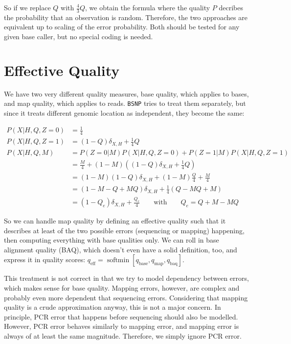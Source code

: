 \documentclass{article}
\begin{document}
So if we replace $Q$ with $\frac{4}{3}Q$, we obtain the formula where the quality $P$ decribes the probability that an observation
is random.  Therefore, the two approaches are equivalent up to scaling of the error probability.  Both should be tested for any
given base caller, but no special coding is needed.

\section{Effective Quality}
\label{app_qualities}

We have two very different quality measures, base quality, which applies to bases, and map quality, which applies to reads.
\texttt{BSNP} tries to treat them separately, but since it treats different genomic location as independent, they become the same:

\begin{align*}
P(X|H,Q,Z=0) &= \frac{1}{4} \\
P(X|H,Q,Z=1) &= (1-Q)\delta_{X,H} + \frac{1}{4}Q \\
P(X|H,Q,M) &= P(Z=0|M) P(X|H,Q,Z=0) + P(Z=1|M) P(X|H,Q,Z=1) \\
&= \frac{M}{4} + (1-M)\left((1-Q)\delta_{X,H} + \frac{1}{4}Q \right) \\
&= (1-M)(1-Q)\delta_{X,H} + (1-M)\frac{Q}{4} + \frac{M}{4} \\
&= (1-M-Q+MQ) \delta_{X,H} + \frac{1}{4}(Q-MQ+M) \\
&= (1-Q_e) \delta_{X,H} + \frac{Q_e}{4} \qquad \mbox{with} \qquad Q_e = Q+M-MQ
\end{align*}

So we can handle map quality by defining an effective quality such that it describes at least of the two possible errors (sequencing
or mapping) happening, then computing everything with base qualities only.  We can roll in base alignment quality (BAQ), which
doesn't even have a solid definition, too, and express it in quality scores: $q_{\operatorname{eff}} = \operatorname{softmin} \left[
q_{\operatorname{base}}, q_{\operatorname{map}}, q_{\operatorname{baq}} \right]$. 

This treatment is not correct in that we try to model dependency between errors, which makes sense for base quality.  Mapping
errors, however, are complex and probably even more dependent that sequencing errors.  Considering that mapping quality is a crude
approximation anyway, this is not a major concern.  In principle, PCR
error that happens before sequencing should also be modelled.  However,
PCR error behaves similarly to mapping error, and mapping error is
always of at least the same magnitude.  Therefore, we simply ignore PCR
error.
\end{document}
